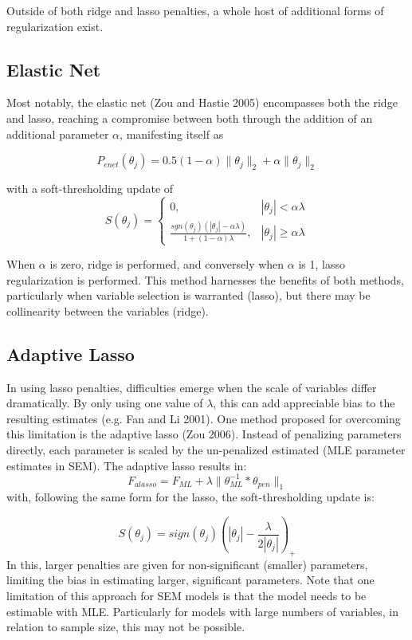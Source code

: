 \documentclass[article]{jss}
\begin{document}
Outside of both ridge and lasso penalties, a whole host of additional
forms of regularization exist.

\subsection{Elastic Net}\label{elastic-net}

Most notably, the elastic net (Zou and Hastie 2005) encompasses both the
ridge and lasso, reaching a compromise between both through the addition
of an additional parameter \(\alpha\), manifesting itself as

\[
P_{enet}(\theta_{j}) = 0.5(1-\alpha)\| \theta_{j} \|_{2} + \alpha\| \theta_{j} \|_{2}
\]

with a soft-thresholding update of \[
S(\theta_{j})= 
\begin{cases}
0,&  |\theta_{j}| < \alpha\lambda\\
\frac{sgn(\theta_{j})(|\theta_{j}|-\alpha\lambda)}{1+(1-\alpha)\lambda},              & |\theta_{j}|\geq\alpha\lambda
\end{cases}
\]

\noindent
When \(\alpha\) is zero, ridge is performed, and conversely when
\(\alpha\) is 1, lasso regularization is performed. This method
harnesses the benefits of both methods, particularly when variable
selection is warranted (lasso), but there may be collinearity between
the variables (ridge).

\subsection{Adaptive Lasso}\label{adaptive-lasso}

In using lasso penalties, difficulties emerge when the scale of
variables differ dramatically. By only using one value of \(\lambda\),
this can add appreciable bias to the resulting estimates (e.g. Fan and
Li 2001). One method proposed for overcoming this limitation is the
adaptive lasso (Zou 2006). Instead of penalizing parameters directly,
each parameter is scaled by the un-penalized estimated (MLE parameter
estimates in SEM). The adaptive lasso results in: \[
F_{alasso} = F_{ML} + \lambda \| \theta_{ML}^{-1} * \theta_{pen} \|_{1}
\] \noindent
with, following the same form for the lasso, the soft-thresholding
update is:

\[
S(\theta_{j})= sign(\theta_{j})(|\theta_{j}|-\frac{\lambda}{2|\theta_{j}|})_{+}
\] \noindent
In this, larger penalties are given for non-significant (smaller)
parameters, limiting the bias in estimating larger, significant
parameters. Note that one limitation of this approach for SEM models is
that the model needs to be estimable with MLE. Particularly for models
with large numbers of variables, in relation to sample size, this may
not be possible.
\end{document}
